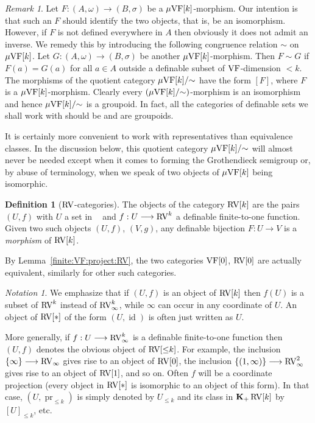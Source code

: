 \documentclass[12pt]{amsart}
\newcommand{\memph}[1]{{\color{magenta}\emph{#1}}}
\theoremstyle{plain}
\theoremstyle{definition}
\newtheorem{defn}[thm]{Definition}
\theoremstyle{remark}
\newtheorem{rem}[thm]{Remark}
\newtheorem{nota}[thm]{Notation}
\numberwithin{equation}{section}
\theoremstyle{plain}
\newcommand{\VF}{\textup{VF}}
\newcommand{\RV}{\textup{RV}}
\DeclareMathOperator{\id}{id}
\DeclareMathOperator{\pr}{pr}
\newcommand{\0}{\emptyset}
\newcommand{\fun}{\longrightarrow}
\newcommand{\mgVF}{{\mu} {\VF}}
\DeclareMathOperator{\gsk}{\mathbf{K}_+}
\DeclareMathOperator{\RVV}{RV_\infty}
\begin{document}
\begin{rem}\label{mor:equi}
Let $F : (A, \omega) \fun (B, \sigma)$ be a $\mgVF[k]$-morphism. Our intention is that such an $F$ should identify the two objects, that is, be an isomorphism. However, if $F$ is not defined everywhere in $A$ then obviously it does not admit an inverse. We remedy this by introducing the following congruence relation $\sim$ on $\mgVF[k]$. Let $G : (A, \omega) \fun (B, \sigma)$ be another $\mgVF[k]$-morphism. Then $F \sim G$ if $F(a) = G(a)$ for all $a \in A$  outside a definable subset  of $\VF$-dimension $< k$. The morphisms of the quotient category $\mgVF[k] /{\sim}$ have the form $[F]$, where $F$ is a $\mgVF[k]$-morphism. Clearly every $(\mgVF[k] / {\sim})$-morphism is an isomorphism and hence $\mgVF[k] / {\sim}$ is a groupoid. In fact, all the categories of definable sets we shall work with should be and are groupoids.

It is certainly more convenient to work with representatives than equivalence classes. In the discussion below, this quotient category $\mgVF[k] /{\sim}$ will almost never be needed except when it comes to forming the Grothendieck semigroup or, by abuse of terminology, when we speak of two objects of $\mgVF[k]$ being isomorphic.
\end{rem}


\begin{defn}[$\RV$-categories]\label{defn:c:RV:cat}
The objects of the category $\RV[k]$ are the pairs $(U, f)$ with $U$ a set in $\RVV$ and $f : U \fun \RV^k$ a definable finite-to-one function. Given two such objects $(U, f)$, $(V, g)$, any definable bijection $F : U \fun V$ is a \memph{morphism} of $\RV[k]$.
\end{defn}

By Lemma~\ref{finite:VF:project:RV}, the two categories $\VF[0]$, $\RV[0]$ are actually equivalent, similarly for other such categories.

\begin{nota}\label{0coor}
We emphasize that if $(U, f)$ is an object of $\RV[k]$ then $f(U)$ is a subset of $\RV^k$ instead of $\RV^k_\infty$, while $\infty$ can occur in any coordinate of $U$. An object of  $\RV[*]$ of the form $(U, \id)$ is often just written as $U$.

More generally, if $f : U \fun \RV_\infty^k$ is a definable finite-to-one function then $(U, f)$ denotes the obvious object of $\RV[{\leq} k]$. For example, the inclusion $\{\infty\} \fun \RV_{\infty}$ gives rise to an object of $\RV[0]$, the inclusion $\{(1, \infty)\} \fun \RV_{\infty}^2$ gives rise to an object of $\RV[1]$, and so on. Often $f$ will be a coordinate projection (every object in $\RV[*]$ is isomorphic to an object of this form). In that case, $(U, \pr_{\leq k})$ is simply denoted by $U_{\leq k}$ and its class in $\gsk \RV[k]$ by $[U]_{\leq k}$, etc.
\end{nota}
\end{document}
